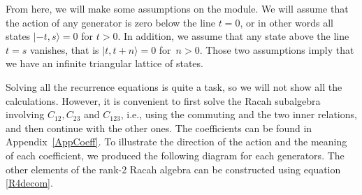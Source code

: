 \documentclass[pdftex]{sigma}
\numberwithin{equation}{section}
\begin{document}
From here, we will make some assumptions on the module. We will assume that the action of any generator is zero below the line $t=0$, or in other words all states $|{-}t,s\rangle=0$ for $t>0$. In addition, we assume that any state above the line $t=s$ vanishes, that is $\vert t,t+n\rangle=0$ for~${n>0}$. Those two assumptions imply that we have an infinite triangular lattice of states.

Solving all the recurrence equations is quite a task, so we will not show all the calculations. However, it is convenient to first solve the Racah subalgebra involving $C_{12},C_{23}$ and $C_{123}$, i.e., using the commuting and the two inner relations, and then continue with the other ones. The coefficients can be found in Appendix~\ref{AppCoeff}. To illustrate the direction of the action and the meaning of each coefficient, we produced the following diagram for each generators.
The other elements of the rank-2 Racah algebra can be constructed using equation \eqref{R4decom}.
\end{document}
